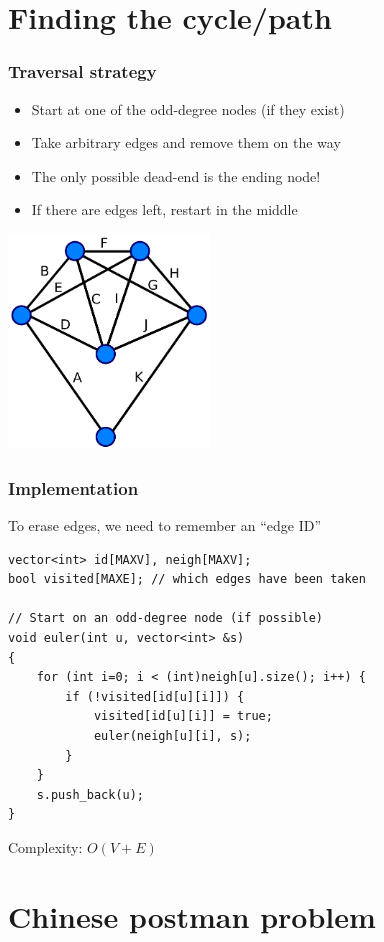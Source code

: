 \documentclass[12pt]{beamer}
\begin{document}
\section{Finding the cycle/path}

\begin{frame}
\frametitle{Traversal strategy}
\begin{itemize}
\item Start at one of the odd-degree nodes (if they exist)
\item Take arbitrary edges and remove them on the way
\item The only possible dead-end is the ending node!
\item If there are edges left, restart in the middle
\end{itemize}
\begin{center}
\includegraphics[width=0.4\textwidth]{img/euler-graph}
\end{center}
\end{frame}

\begin{frame}[fragile]
\frametitle{Implementation}
To erase edges, we need to remember an ``edge ID''
\begin{lstlisting}
vector<int> id[MAXV], neigh[MAXV];
bool visited[MAXE]; // which edges have been taken

// Start on an odd-degree node (if possible)
void euler(int u, vector<int> &s)
{
    for (int i=0; i < (int)neigh[u].size(); i++) {
        if (!visited[id[u][i]]) {
            visited[id[u][i]] = true;
            euler(neigh[u][i], s);
        }
    }
    s.push_back(u);
}
\end{lstlisting}
Complexity: $O(V+E)$
\end{frame}

\section{Chinese postman problem}
\end{document}
